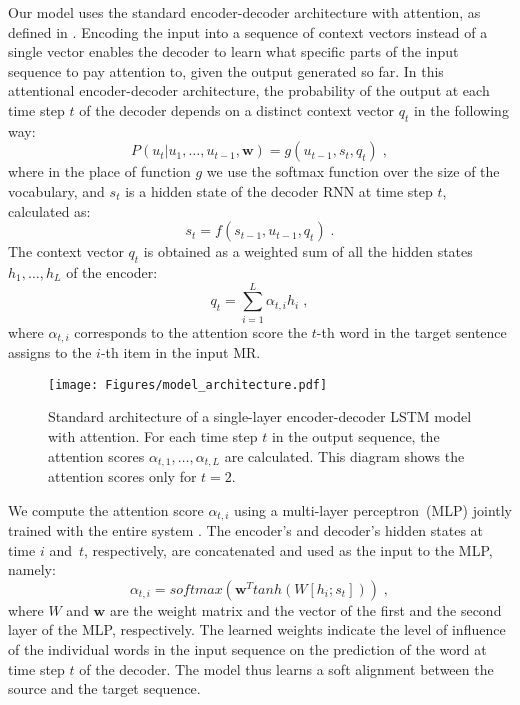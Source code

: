 \documentclass[11pt,a4paper]{article}
\begin{document}
Our model uses the standard encoder-decoder architecture with attention, as defined in \citet{bahdanau2015neural}. Encoding the input into a sequence of context vectors instead of a single vector enables the decoder to learn what specific parts of the input sequence to pay attention to, given the output generated so far. In this attentional encoder-decoder architecture, the probability of the output at each time step $t$ of the decoder depends on a distinct context vector $q_t$ in the following way:
\[ P(u_t | u_1,\ldots, u_{t-1}, \mathbf{w}) = g(u_{t-1}, s_t, q_t) \;, \]
where in the place of function $g$ we use the softmax function over the size of the vocabulary, and $s_t$ is a hidden state of the decoder RNN at time step $t$, calculated as:
\[ s_t = f(s_{t-1}, u_{t-1}, q_t) \;. \]
The context vector $q_t$ is obtained as a weighted sum of all the hidden states $h_1,\ldots, h_L$ of the encoder:
\[ q_t = \sum_{i=1}^{L} \alpha_{t,i} h_i \;, \]
where $\alpha_{t,i}$ corresponds to the attention score the $t$-th word in the target sentence assigns to the $i$-th item in the input MR.

\begin{figure}
  \begin{center}
  	\texttt{[image: Figures/model\_architecture.pdf]}
  \end{center}
  \vspace{-0.4cm}
  \caption{Standard architecture of a single-layer encoder-decoder LSTM model with attention. For each time step $t$ in the output sequence, the attention scores $\alpha_{t,1}, \dots, \alpha_{t,L}$ are calculated. This diagram shows the attention scores only for $t=2$.}
  \label{fig:enc_dec}
\end{figure}

We compute the attention score $\alpha_{t,i}$ using a multi-layer perceptron~(MLP) jointly trained with the entire system \cite{bahdanau2015neural}. The encoder's and decoder's hidden states at time $i$ and~$t$, respectively, are concatenated and used as the input to the MLP, namely:
\[ \alpha_{t,i} = softmax\left( \mathbf{w}^T tanh\left(W[h_i ; s_t]\right) \right) \;, \] 
where $W$ and $\mathbf{w}$ are the weight matrix and the vector of the first and the second layer of the MLP, respectively. The learned weights indicate the level of influence of the individual words in the input sequence on the prediction of the word at time step $t$ of the decoder. The model thus learns a soft alignment between the source and the target sequence.
\end{document}
